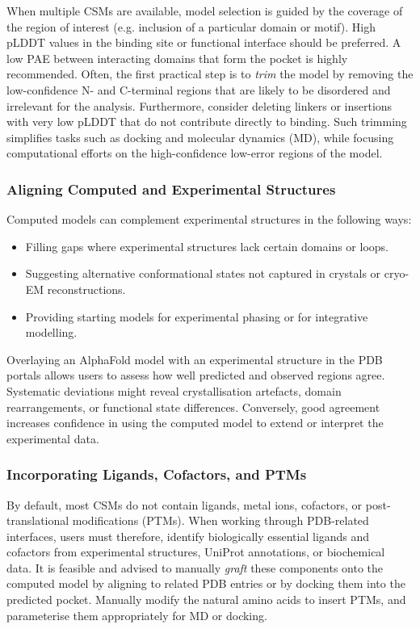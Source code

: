\documentclass[12pt]{article}
\begin{document}
When multiple CSMs are available, model selection is guided by the coverage of the region of interest (e.g. inclusion of a particular domain or motif). High pLDDT values in the binding site or functional interface should be preferred. A low PAE between interacting domains that form the pocket is highly recommended.  Often, the first practical step is to \emph{trim} the model by removing the low-confidence N- and C-terminal regions that are likely to be disordered and irrelevant for the analysis. Furthermore, consider deleting linkers or insertions with very low pLDDT that do not contribute directly to binding. Such trimming simplifies tasks such as docking and molecular dynamics (MD), while focusing computational efforts on the high-confidence low-error regions of the model.

\subsubsection{Aligning Computed and Experimental Structures}

Computed models can complement experimental structures in the following ways:
\begin{itemize}
  \item Filling gaps where experimental structures lack certain domains or loops.
  \item Suggesting alternative conformational states not captured in crystals or cryo-EM reconstructions.
  \item Providing starting models for experimental phasing or for integrative modelling.
\end{itemize}
Overlaying an AlphaFold model with an experimental structure in the PDB portals allows users to assess how well predicted and observed regions agree\cite{CH4_Varadi2022_AlphaFoldDB,CH4_Burley2022}. Systematic deviations might reveal crystallisation artefacts, domain rearrangements, or functional state differences. Conversely, good agreement increases confidence in using the computed model to extend or interpret the experimental data.

\subsubsection{Incorporating Ligands, Cofactors, and PTMs}

By default, most CSMs do not contain ligands, metal ions, cofactors, or post-translational modifications (PTMs).  When working through PDB-related interfaces, users must therefore,  identify biologically essential ligands and cofactors from experimental structures, UniProt annotations, or biochemical data. It is feasible and advised to manually \emph{graft} these components onto the computed model by aligning to related PDB entries or by docking them into the predicted pocket. Manually modify the natural amino acids to insert PTMs, and parameterise them appropriately for MD or docking.
\end{document}
